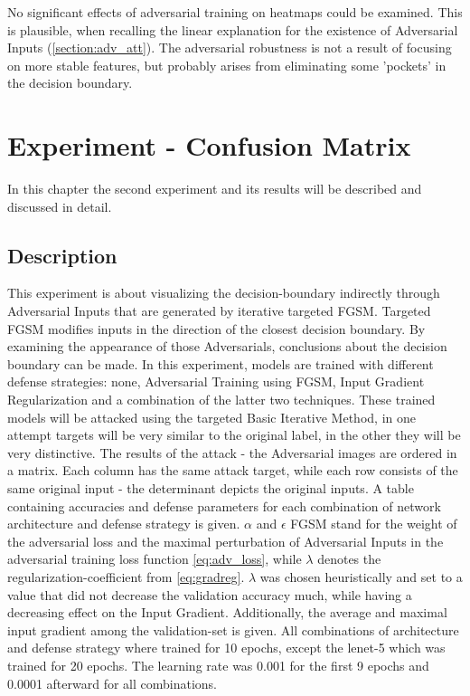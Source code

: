 \documentclass[draft,final]{vutinfth} %
\begin{document}
No significant effects of adversarial training on heatmaps could be examined.
This is plausible, when recalling the linear explanation for the existence of Adversarial Inputs (\ref{section:adv_att}).
The adversarial robustness is not a result of focusing on more stable features, but probably arises from eliminating some 'pockets' in the decision boundary.


\chapter{Experiment - Confusion Matrix}

In this chapter the second experiment and its results will be described and discussed in detail.

\section{Description}
This experiment is about visualizing the decision-boundary indirectly through Adversarial Inputs that are generated by iterative targeted FGSM.
Targeted FGSM modifies inputs in the direction of the closest decision boundary.
By examining the appearance of those Adversarials, conclusions about the decision boundary can be made.
In this experiment, models are trained with different defense strategies: none, Adversarial Training using FGSM, Input Gradient Regularization and a combination of the latter two techniques.
These trained models will be attacked using the targeted Basic Iterative Method, in one attempt targets will be very similar to the original label, in the other they will be very distinctive.
The results of the attack - the Adversarial images are ordered in a matrix.
Each column has the same attack target, while each row consists of the same original input - the determinant depicts the original inputs.
A table containing accuracies and defense parameters for each combination of network architecture and defense strategy is given.
$\alpha$ and $\epsilon$ FGSM stand for the weight of the adversarial loss and the maximal perturbation of Adversarial Inputs in the adversarial training loss function \ref{eq:adv_loss}, while $\lambda$ denotes the regularization-coefficient from \ref{eq:gradreg}. $\lambda$ was chosen heuristically and set to a value that did not decrease the validation accuracy much, while having a decreasing effect on the Input Gradient.
Additionally, the average and maximal input gradient among the validation-set is given.
All combinations of architecture and defense strategy where trained for 10 epochs, except the lenet-5 which was trained for 20 epochs.
The learning rate was 0.001 for the first 9 epochs and 0.0001 afterward for all combinations.
\end{document}

